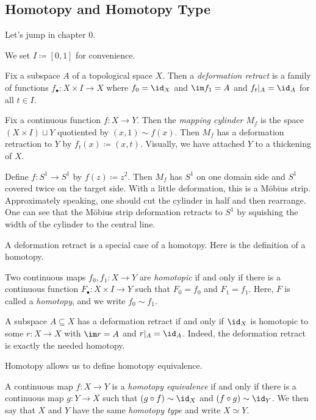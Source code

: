 \documentclass[../notes.tex]{subfiles}
\begin{document}
\subsection{Homotopy and Homotopy Type}
Let's jump in chapter 0.
\begin{notation}
	We set $I\coloneqq[0,1]$ for convenience.
\end{notation}
\begin{definition}
	Fix a subspace $A$ of a topological space $X$. Then a \textit{deformation retract} is a family of functions $f_\bullet\colon X\times I\to X$ where $f_0=\id_X$ and $\im f_1=A$ and $f_t|_A=\id_A$ for all $t\in I$.
\end{definition}
\begin{example}
	Fix a continuous function $f\colon X\to Y$. Then the \textit{mapping cylinder} $M_f$ is the space $(X\times I)\sqcup Y$ quotiented by $(x,1)\sim f(x)$. Then $M_f$ has a deformation retraction to $Y$ by $f_t(x)\coloneqq(x,t)$. Visually, we have attached $Y$ to a thickening of $X$.
\end{example}
\begin{example} \label{ex:mobius-by-cylinder}
	Define $f\colon S^1\to S^1$ by $f(z)\coloneqq z^2$. Then $M_f$ has $S^1$ on one domain side and $S^1$ covered twice on the target side. With a little deformation, this is a M\"obius strip. Approximately speaking, one should cut the cylinder in half and then rearrange. One can see that the M\"obius strip deformation retracts to $S^1$ by squishing the width of the cylinder to the central line.
\end{example}
A deformation retract is a special case of a homotopy. Here is the definition of a homotopy.
\begin{definition}[homotopy]
	Two continuous maps $f_0,f_1\colon X\to Y$ are \textit{homotopic} if and only if there is a continuous function $F_\bullet\colon X\times I\to Y$ such that $F_0=f_0$ and $F_1=f_1$. Here, $F$ is called a \textit{homotopy}, and we write $f_0\sim f_1$.
\end{definition}
\begin{example}
	A subspace $A\subseteq X$ has a deformation retract if and only if $\id_X$ is homotopic to some $r\colon X\to X$ with $\im r=A$ and $r|_A=\id_A$. Indeed, the deformation retract is exactly the needed homotopy.
\end{example}
Homotopy allows us to define homotopy equivalence.
\begin{definition}
	A continuous map $f\colon X\to Y$ is a \textit{homotopy equivalence} if and only if there is a continuous map $g\colon Y\to X$ such that $(g\circ f)\sim\id_X$ and $(f\circ g)\sim\id_Y$. We then say that $X$ and $Y$ have the same \textit{homotopy type} and write $X\simeq Y$.
\end{definition}
\end{document}
